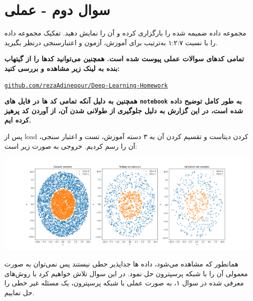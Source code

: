 \section{سوال دوم - عملی}
مجموعه داده ضمیمه شده را بارگزاری کرده و آن را نمایش دهید. تفکیک مجموعه داده را با نسبت ۱:۲:۷ به‌ترتیب برای آموزش، آزمون و اعتبارسنجی درنظر بگیرید.

\textbf{تمامی کدهای سوالات عملی پیوست شده است. همچنین می‌توانید کد‌ها را از گیتهاب بنده به لینک زیر مشاهده و بررسی کنید: }

\begin{latin}
	\texttt{\href{https://github.com/rezaAdinepour/Deep-Learning-Homework}{github.com/rezaAdinepour/Deep-Learning-Homework}} 
\end{latin}

\textbf{همچنین به دلیل آنکه تمامی کد ها در فایل های \texttt{notebook} به طور کامل توضیح داده شده است، در این گزارش به دلیل جلوگیری از طولانی شدن آن، از آوردن کد پرهیز کرده ایم.}


\begin{qsolve}
	
	پس از load کردن دیتاست و تقسیم کردن آن به ۳ دسته آموزش، تست و اعتبار سنجی، آن را رسم کردیم. خروجی به صورت زیر است:
	
	\begin{center}
		\includegraphics*[width=1\linewidth]{pics/img7.png}
		\label{دیتاست مسئله}
	\end{center}
	
	همانطور که مشاهده می‌شود، داده ها جداپذیر حطی نیستند پس نمی‌توان به صورت معمولی آن را با شبکه پرسپترون حل نمود. در این سوال تلاش خواهیم کرد با روش‌های معرفی شده در سوال ۱، به صورت عملی با شبکه پرسپترون، یک مسئله غیر خطی را حل نماییم.
\end{qsolve}



